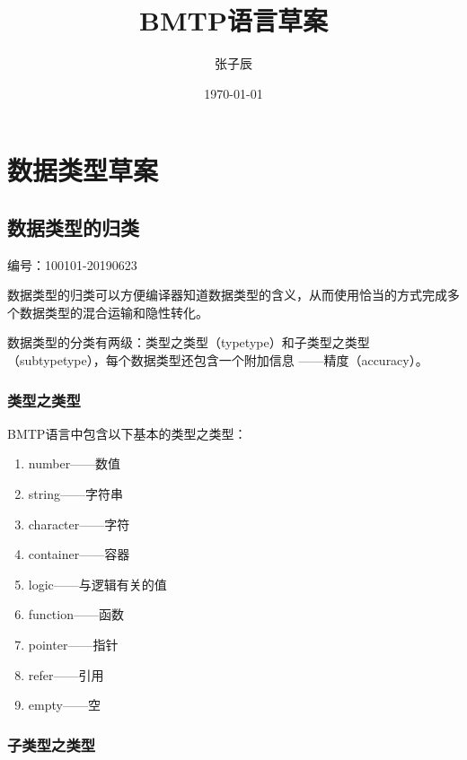 \documentclass[11pt]{ctexrep}
\begin{document}
\title{BMTP语言草案}
\author{张子辰}
\date{\today}
\maketitle
\tableofcontents
\chapter{数据类型草案}

\section{数据类型的归类}
\begin{flushright}
\sf
编号：100101-20190623
\end{flushright} 

数据类型的归类可以方便编译器知道数据类型的含义，从而使用恰当的方式完成多个数据类型的混合运输和隐性转化。

数据类型的分类有两级：类型之类型（typetype）和子类型之类型（subtypetype），每个数据类型还包含一个附加信息
——精度（accuracy）。

\subsection{类型之类型}

BMTP语言中包含以下基本的类型之类型：
\begin{enumerate}
\item number——数值
\item string——字符串
\item character——字符
\item container——容器
\item logic——与逻辑有关的值
\item function——函数
\item pointer——指针
\item refer——引用
\item empty——空
\end{enumerate}

\subsection{子类型之类型}
\end{document}
